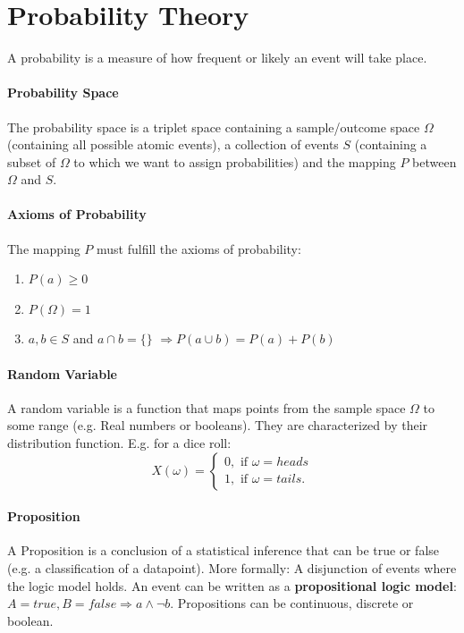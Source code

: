 \documentclass[../main.tex]{subfiles}
\begin{document}
\section{Probability Theory} \label{probability}
A probability is a measure of how frequent or likely an event will take place. 

\paragraph{Probability Space}  The probability space is a triplet space containing a sample/outcome space $\Omega$ (containing all possible atomic events), a collection of events $S$ (containing a subset of $\Omega$ to which we want to assign probabilities) and the mapping $P$ between $\Omega$ and $S$. 
\paragraph{Axioms of Probability}  The mapping $P$ must fulfill the axioms of probability: 
        \begin{enumerate}
            \item $P(a) \geq 0$
            \item $P(\Omega) = 1$
            \item $a,b \in S$ and $a \cap b = \{\}$ $ \Rightarrow P(a \cup b) = P(a) + P(b)$
        \end{enumerate}
\paragraph{Random Variable}  A random variable is a function that maps points from the sample space $\Omega$ to some range (e.g. Real numbers or booleans). They are characterized by their distribution function. E.g. for a dice roll:
        \[ X(\omega) = \begin{cases} 
            0, \text{ if } \omega = heads\\
            1, \text{ if } \omega = tails.
        \end{cases}
        \]
\paragraph{Proposition}  A Proposition is a conclusion of a statistical inference that can be true or false (e.g. a classification of a datapoint). More formally: A disjunction of events where the logic model holds. An event can be written as a \textbf{propositional logic model}:\\ $A = true, B = false \Rightarrow a \land \neg b $. Propositions can be continuous, discrete or boolean. 
\end{document}
